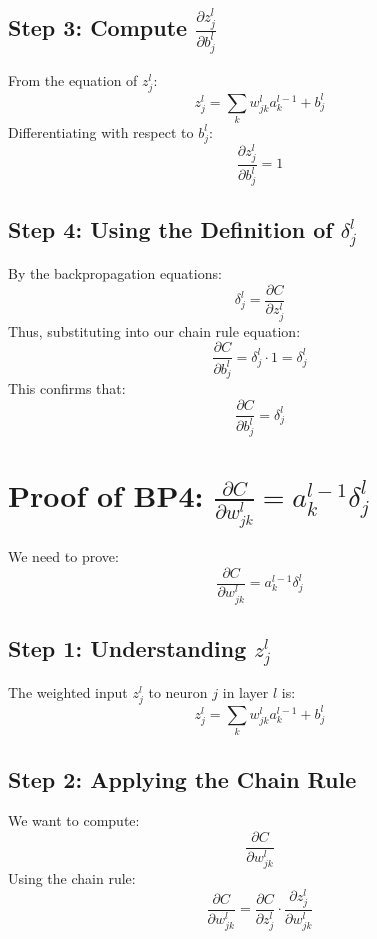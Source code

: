 \documentclass{article}
\begin{document}
\subsection{Step 3: Compute $\frac{\partial z_j^l}{\partial b_j^l}$}
From the equation of $z_j^l$:
\begin{equation}
    z_j^l = \sum_k w_{jk}^{l} a_k^{l-1} + b_j^l
\end{equation}
Differentiating with respect to $b_j^l$:
\begin{equation}
    \frac{\partial z_j^l}{\partial b_j^l} = 1
\end{equation}

\subsection{Step 4: Using the Definition of $\delta_j^l$}
By the backpropagation equations:
\begin{equation}
    \delta_j^l = \frac{\partial C}{\partial z_j^l}
\end{equation}
Thus, substituting into our chain rule equation:
\begin{equation}
    \frac{\partial C}{\partial b_j^l} = \delta_j^l \cdot 1 = \delta_j^l
\end{equation}
This confirms that:
\begin{equation}
    \frac{\partial C}{\partial b_j^l} = \delta_j^l
\end{equation}

\newpage

\section{Proof of BP4: $\frac{\partial C}{\partial w_{jk}^l} = a_k^{l-1} \delta_j^l$}
We need to prove:
\begin{equation}
    \frac{\partial C}{\partial w_{jk}^l} = a_k^{l-1} \delta_j^l
\end{equation}

\subsection{Step 1: Understanding $z_j^l$}
The weighted input $z_j^l$ to neuron $j$ in layer $l$ is:
\begin{equation}
    z_j^l = \sum_k w_{jk}^{l} a_k^{l-1} + b_j^l
\end{equation}

\subsection{Step 2: Applying the Chain Rule}
We want to compute:
\begin{equation}
    \frac{\partial C}{\partial w_{jk}^l}
\end{equation}
Using the chain rule:
\begin{equation}
    \frac{\partial C}{\partial w_{jk}^l} = \frac{\partial C}{\partial z_j^l} \cdot \frac{\partial z_j^l}{\partial w_{jk}^l}
\end{equation}
\end{document}
